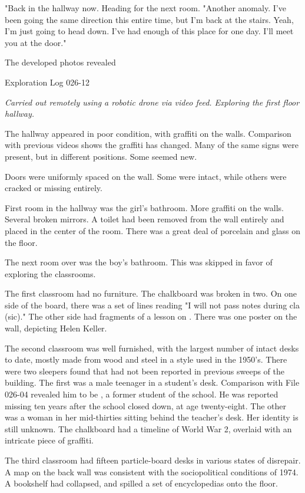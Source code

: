 "Back in the hallway now. Heading for the next room.
\newpage
"Another anomaly. I've been going the same direction this entire time, but I'm back at the stairs. Yeah, I'm just going to head down. I've had enough of this place for one day. I'll meet you at the door."

The developed photos revealed \redacted
\bigskip
\begin{flushleft}
Exploration Log 026-12
\end{flushleft}
\textsl{Carried out remotely using a robotic drone via video feed. Exploring the first floor hallway.}

The hallway appeared in poor condition, with graffiti on the walls. Comparison with previous videos shows the graffiti has changed. Many of the same signs were present, but in different positions. Some seemed new.

Doors were uniformly spaced on the wall. Some were intact, while others were cracked or missing entirely.

First room in the hallway was the girl's bathroom. More graffiti on the walls. Several broken mirrors. A toilet had been removed from the wall entirely and placed in the center of the room. There was a great deal of porcelain and glass on the floor.

The next room over was the boy's bathroom. This was skipped in favor of exploring the classrooms.

The first classroom had no furniture. The chalkboard was broken in two. On one side of the board, there was a set of lines reading "I will not pass notes during cla (sic)." The other side had fragments of a lesson on \redacted. There was one poster on the wall, depicting Helen Keller.

The second classroom was well furnished, with the largest number of intact desks to date, mostly made from wood and steel in a style used in the 1950's. There were two sleepers found that had not been reported in previous sweeps of the building. The first was a male teenager in a student's desk. Comparison with File 026-04 revealed him to be  , a former student of the school. He was reported missing ten years after the school closed down, at age twenty-eight. The other was a woman in her mid-thirties sitting behind the teacher's desk. Her identity is still unknown. The chalkboard had a timeline of World War 2, overlaid with an intricate piece of graffiti.

The third classroom had fifteen particle-board desks in various states of disrepair. A map on the back wall was consistent with the sociopolitical conditions of 1974. A bookshelf had collapsed, and spilled a set of encyclopedias onto the floor.

